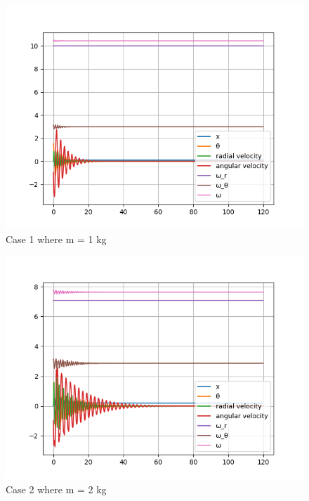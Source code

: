 \begin{figure}[H]
    \centering
    \includegraphics[width=15cm]{ExpPictures/m1.png}
    \caption{{Case 1 where m = 1 kg}}
    \label{}
\end{figure}
        
\begin{figure}[H]
    \centering
    \includegraphics[width=15cm]{ExpPictures/m2.png}
    \caption{{Case 2 where m = 2 kg}}
    \label{}
\end{figure}
        
